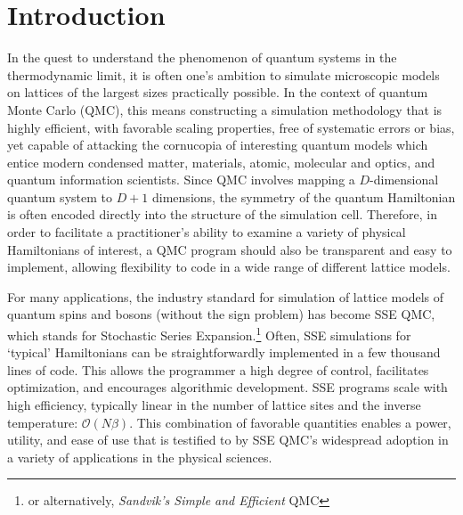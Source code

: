 \documentclass[vecphys]{svmult}
\begin{document}
\section{Introduction}
\label{sec:1}
In the quest to understand the phenomenon of quantum systems in the thermodynamic limit, it is often one's ambition to simulate
microscopic models on lattices of the largest sizes practically possible.  In the context of quantum Monte Carlo (QMC), this means
constructing a simulation methodology that is highly efficient, with favorable scaling properties, free of systematic errors or bias, yet capable of attacking the cornucopia of interesting quantum models which entice modern condensed matter, materials, atomic, molecular and optics, and quantum information scientists.
Since QMC involves mapping a $D$-dimensional quantum system to $D+1$ dimensions, the symmetry of the quantum Hamiltonian is often encoded directly into the structure of the simulation cell.  Therefore, in order to facilitate a practitioner's ability to examine a variety of physical Hamiltonians of interest, a QMC program should also be transparent and easy to implement, allowing flexibility to code in a wide range of different lattice models. 

For many applications, the industry standard for simulation of lattice models of quantum spins and bosons (without the sign problem) has become SSE QMC, which stands for Stochastic Series Expansion.\footnote{or alternatively, \textit{Sandvik's Simple and Efficient} QMC}   Often, SSE simulations for \lq typical' Hamiltonians can be straightforwardly implemented in a few thousand lines of code.
This allows the programmer a high degree of control, facilitates optimization, and encourages algorithmic development.
SSE programs scale with high efficiency, typically linear in the number of lattice sites and the inverse temperature: $\mathcal{O}(N\beta)$.  This combination of favorable quantities enables a power, utility, and ease of use that is testified to by SSE QMC's widespread adoption in a variety of applications in the physical sciences.
\end{document}
